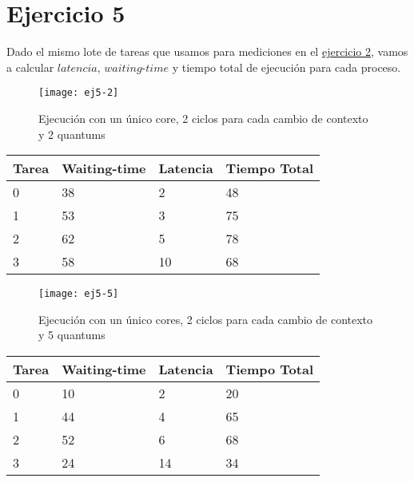 \section{Ejercicio 5}

Dado el mismo lote de tareas que usamos para mediciones en el \hyperref[sec:ej2]{ejercicio 2}, vamos a calcular $latencia$, $waiting$-$time$ y tiempo total de ejecución para cada proceso.


\begin{figure}[H]
		\centering
		\texttt{[image: ej5-2]}
		\caption{Ejecución con un único core, 2 ciclos para cada cambio de contexto y 2 quantums}
		\label{fig:ej5.2}
\end{figure}

\begin{center}
		\begin{tabular}{| l | l | l | l |}
				\hline
				Tarea & Waiting-time & Latencia & Tiempo Total	\\ \hline
				0 &	38	 &	2	 &	48	\\
				1 &	53	 &	3	 &	75	\\
				2 &	62	 &	5	 &	78	\\
				3 &	58	 &	10 &	68	\\
				\hline
		\end{tabular}
\end{center}

\begin{figure}[H]
		\centering
		\texttt{[image: ej5-5]}
		\caption{Ejecución con un único cores, 2 ciclos para cada cambio de contexto y 5 quantums}
		\label{fig:ej5-5}
\end{figure}

\begin{center}
		\begin{tabular}{| l | l | l | l |}
				\hline
				Tarea & Waiting-time & Latencia & Tiempo Total	\\ \hline
				0 & 10 & 2  & 20 \\
				1 & 44 & 4  & 65 \\
				2 & 52 & 6  & 68 \\
				3 & 24 & 14 & 34 \\
				\hline
		\end{tabular}
\end{center}


